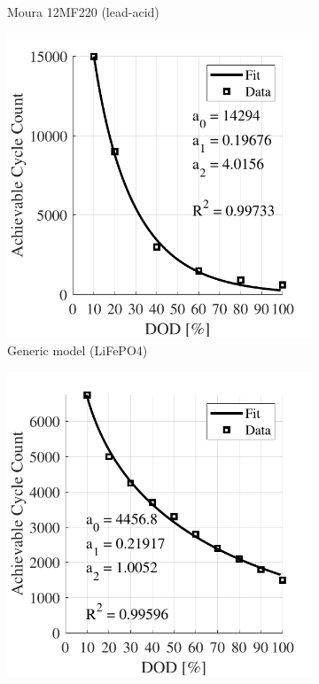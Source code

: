 \documentclass{ieeeaccess}
\begin{document}
\begin{figure}[!h]
\begin{subfigure}{.235\textwidth}
    		\caption{Moura 12MF220 (lead-acid)}
    		\label{fig:accMoura}
    	\end{subfigure}

    	\begin{subfigure}{.235\textwidth}
    		\centering
    		\includegraphics[width=\linewidth]{figures/acc_fitting_Unknown_model_LiPO4.pdf}
    		\caption{Generic model (LiFePO4) \cite{BATUNI2020}}
    		\label{fig:accLipeo4}
    	\end{subfigure}
    	\begin{subfigure}{.235\textwidth}
    		\centering
    		\includegraphics[width=\linewidth]{figures/acc_fitting_Rolls_16CH35P_lead-acid.pdf}

\end{subfigure}
\end{figure}
\end{document}
